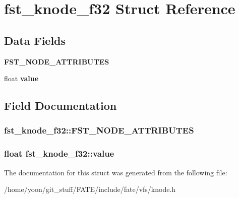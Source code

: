 \hypertarget{structfst__knode__f32}{\section{fst\-\_\-knode\-\_\-f32 Struct Reference}
\label{structfst__knode__f32}
}
\subsection*{Data Fields}
\begin{DoxyCompactItemize}
\item 
\hypertarget{structfst__knode__f32_adac69a70bc7fd5e7b332d3e5d60a1f2a}{{\bfseries F\-S\-T\-\_\-\-N\-O\-D\-E\-\_\-\-A\-T\-T\-R\-I\-B\-U\-T\-E\-S}}\label{structfst__knode__f32_adac69a70bc7fd5e7b332d3e5d60a1f2a}

\item 
\hypertarget{structfst__knode__f32_acfe4d80be3188c6532f84cd9940c0479}{float {\bfseries value}}\label{structfst__knode__f32_acfe4d80be3188c6532f84cd9940c0479}

\end{DoxyCompactItemize}


\subsection{Field Documentation}
\hypertarget{structfst__knode__f32_adac69a70bc7fd5e7b332d3e5d60a1f2a}{
\subsubsection[{F\-S\-T\-\_\-\-N\-O\-D\-E\-\_\-\-A\-T\-T\-R\-I\-B\-U\-T\-E\-S}]{\setlength{\rightskip}{0pt plus 5cm}fst\-\_\-knode\-\_\-f32\-::\-F\-S\-T\-\_\-\-N\-O\-D\-E\-\_\-\-A\-T\-T\-R\-I\-B\-U\-T\-E\-S}}\label{structfst__knode__f32_adac69a70bc7fd5e7b332d3e5d60a1f2a}
\hypertarget{structfst__knode__f32_acfe4d80be3188c6532f84cd9940c0479}{
\subsubsection[{value}]{\setlength{\rightskip}{0pt plus 5cm}float fst\-\_\-knode\-\_\-f32\-::value}}\label{structfst__knode__f32_acfe4d80be3188c6532f84cd9940c0479}


The documentation for this struct was generated from the following file\-:\begin{DoxyCompactItemize}
\item 
/home/yoon/git\-\_\-stuff/\-F\-A\-T\-E/include/fate/vfs/knode.\-h\end{DoxyCompactItemize}
